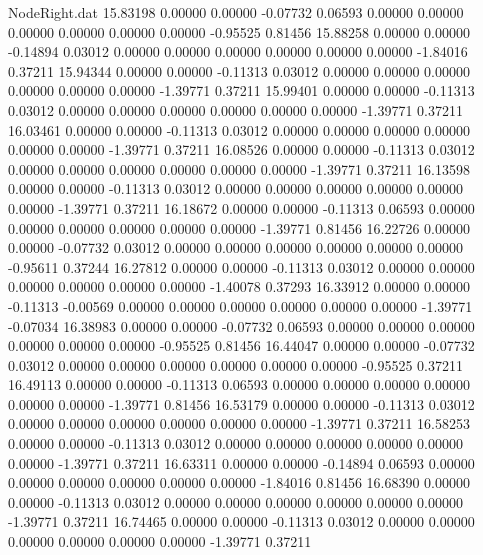 \begin{filecontents}{NodeRight.dat}
  15.83198    0.00000    0.00000    -0.07732    0.06593    0.00000    0.00000    0.00000    0.00000    0.00000    0.00000   -0.95525    0.81456
  15.88258    0.00000    0.00000    -0.14894    0.03012    0.00000    0.00000    0.00000    0.00000    0.00000    0.00000   -1.84016    0.37211
  15.94344    0.00000    0.00000    -0.11313    0.03012    0.00000    0.00000    0.00000    0.00000    0.00000    0.00000   -1.39771    0.37211
  15.99401    0.00000    0.00000    -0.11313    0.03012    0.00000    0.00000    0.00000    0.00000    0.00000    0.00000   -1.39771    0.37211
  16.03461    0.00000    0.00000    -0.11313    0.03012    0.00000    0.00000    0.00000    0.00000    0.00000    0.00000   -1.39771    0.37211
  16.08526    0.00000    0.00000    -0.11313    0.03012    0.00000    0.00000    0.00000    0.00000    0.00000    0.00000   -1.39771    0.37211
  16.13598    0.00000    0.00000    -0.11313    0.03012    0.00000    0.00000    0.00000    0.00000    0.00000    0.00000   -1.39771    0.37211
  16.18672    0.00000    0.00000    -0.11313    0.06593    0.00000    0.00000    0.00000    0.00000    0.00000    0.00000   -1.39771    0.81456
  16.22726    0.00000    0.00000    -0.07732    0.03012    0.00000    0.00000    0.00000    0.00000    0.00000    0.00000   -0.95611    0.37244
  16.27812    0.00000    0.00000    -0.11313    0.03012    0.00000    0.00000    0.00000    0.00000    0.00000    0.00000   -1.40078    0.37293
  16.33912    0.00000    0.00000    -0.11313   -0.00569    0.00000    0.00000    0.00000    0.00000    0.00000    0.00000   -1.39771   -0.07034
  16.38983    0.00000    0.00000    -0.07732    0.06593    0.00000    0.00000    0.00000    0.00000    0.00000    0.00000   -0.95525    0.81456
  16.44047    0.00000    0.00000    -0.07732    0.03012    0.00000    0.00000    0.00000    0.00000    0.00000    0.00000   -0.95525    0.37211
  16.49113    0.00000    0.00000    -0.11313    0.06593    0.00000    0.00000    0.00000    0.00000    0.00000    0.00000   -1.39771    0.81456
  16.53179    0.00000    0.00000    -0.11313    0.03012    0.00000    0.00000    0.00000    0.00000    0.00000    0.00000   -1.39771    0.37211
  16.58253    0.00000    0.00000    -0.11313    0.03012    0.00000    0.00000    0.00000    0.00000    0.00000    0.00000   -1.39771    0.37211
  16.63311    0.00000    0.00000    -0.14894    0.06593    0.00000    0.00000    0.00000    0.00000    0.00000    0.00000   -1.84016    0.81456
  16.68390    0.00000    0.00000    -0.11313    0.03012    0.00000    0.00000    0.00000    0.00000    0.00000    0.00000   -1.39771    0.37211
  16.74465    0.00000    0.00000    -0.11313    0.03012    0.00000    0.00000    0.00000    0.00000    0.00000    0.00000   -1.39771    0.37211

\end{filecontents}
